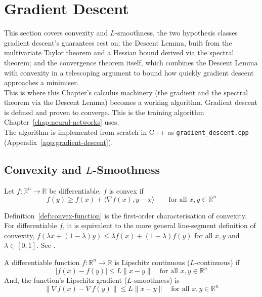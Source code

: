 \section{Gradient Descent}
\label{sec:gradient-descent}
	
	This section covers convexity and $L$-smoothness, the two hypothesis classes gradient descent's guarantees rest on; the Descent Lemma, built from the multivariate Taylor theorem and a Hessian bound derived via the spectral theorem; and the convergence theorem itself, which combines the Descent Lemma with convexity in a telescoping argument to bound how quickly gradient descent approaches a minimiser. \\
	
	This is where this Chapter's calculus machinery (the gradient and the spectral theorem via the Descent Lemma) becomes a working algorithm. Gradient descent is defined and proven to converge. This is the training algorithm Chapter~\ref{chap:neural-networks} uses. \\
	
	The algorithm is implemented from scratch in C++ as \texttt{gradient\_descent.cpp} (Appendix~\ref{app:gradient-descent}).
	
	\subsection{Convexity and $L$-Smoothness}
		
		\begin{definition}
			\label{def:convex-function}
			Let $f:\mathbb{R}^n\to\mathbb{R}$ be differentiable. $f$ is convex if
			\[
				f(y) \ge f(x) + \langle \nabla f(x), y-x \rangle \qquad \text{for all } x,y\in\mathbb{R}^n
			\]
		\end{definition}
		
		\begin{remark}
			\label{rem:convex-first-order-characterisation}
			Definition~\ref{def:convex-function} is the first-order characterisation of convexity. For differentiable $f$, it is equivalent to the more general line-segment definition of convexity, $f(\lambda x+(1-\lambda)y)\le\lambda f(x)+(1-\lambda)f(y)$ for all $x,y$ and $\lambda\in[0,1]$. See \cite[\S3.1]{BoydVandenberghe2004}.
		\end{remark}
		
		\begin{definition}
			\label{def:l-smooth}
			A differentiable function $f: \mathbb{R}^n \to \mathbb{R}$ is Lipschitz continuous ($L$-continuous) if
			\[
				|f(x) - f(y)| \le L\|x - y\| \quad \text{for all } x, y \in \mathbb{R}^n
			\]
			And, the function's Lipschitz gradient ($L$-smoothness) is
			\[
				\|\nabla f(x) - \nabla f(y)\| \le L\|x - y\| \quad \text{for all } x,y \in \mathbb{R}^n
			\]
		\end{definition}
		
